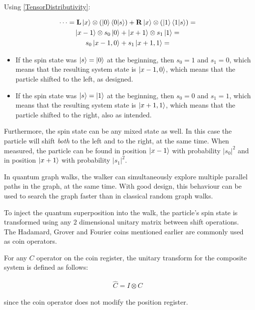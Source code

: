 Using \hyperref[TensorDistributivity]{[TensorDistributivity]}:

\begin{gather*}
    \dots = \mathbf{L}\ket{x}\otimes(\ket{0}\bra{0}\ket{s}) + \mathbf{R}\ket{x}\otimes(\ket{1}\bra{1}\ket{s}) = \\
    \ket{x-1}\otimes{}s_0\ket{0} + \ket{x+1}\otimes{}s_1\ket{1} = \\
    s_0\ket{x-1, 0} + s_1\ket{x+1,1} = \\
\end{gather*}

\begin{itemize}
\item If the spin state was $\ket{s} = \ket{0}$ at the beginning, then $s_0=1$ and $s_1=0$, which means that the resulting system state is $\ket{x-1,0}$, which means that the particle shifted to the left, as designed.
\item If the spin state was $\ket{s} = \ket{1}$ at the beginning, then $s_0=0$ and $s_1=1$, which means that the resulting system state is $\ket{x+1,1}$, which means that the particle shifted to the right, also as intended.
\end{itemize}

Furthermore, the spin state can be any mixed state as well. In this case the particle will shift \textit{both} to the left and to the right, at the same time. When measured, the particle can be found in position $\ket{x-1}$ with probability $|s_0|^2$ and in position $\ket{x+1}$ with probability $|s_1|^2$.

In quantum graph walks, the walker can simultaneously explore multiple parallel paths in the graph, at the same time. With good design, this behaviour can be used to search the graph faster than in classical random graph walks.


To inject the quantum superposition into the walk, the particle's spin state is transformed using any $2$ dimensional unitary matrix between shift operations. The Hadamard, Grover and Fourier coins mentioned earlier are commonly used as coin operators.

For any $C$ operator on the coin register, the unitary transform for the composite system is defined as follows:

\begin{align*}
    \hat{C} = I \otimes C
\end{align*}

since the coin operator does not modify the position register.

